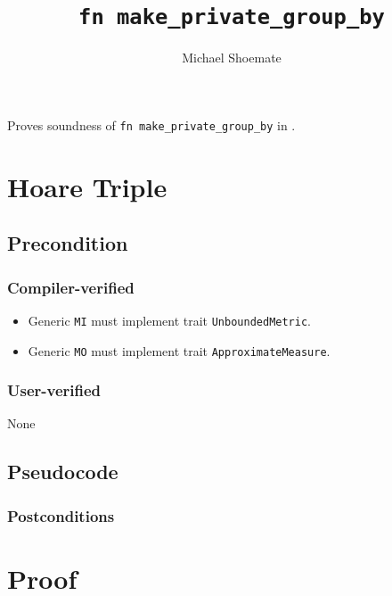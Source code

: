 \documentclass{article}
\title{\texttt{fn make\_private\_group\_by}}
\author{Michael Shoemate}
\date{}
\begin{document}
\maketitle

\contrib
Proves soundness of \texttt{fn make\_private\_group\_by} in .

\section{Hoare Triple}
\subsection*{Precondition}
\subsubsection*{Compiler-verified}
\begin{itemize}
    \item Generic \texttt{MI} must implement trait \texttt{UnboundedMetric}.
    \item Generic \texttt{MO} must implement trait \texttt{ApproximateMeasure}.
\end{itemize}

\subsubsection*{User-verified}
None

\subsection*{Pseudocode}


\subsubsection*{Postconditions}
\begin{theorem}
    \label{postcondition}
\end{theorem}
\section{Proof}
\end{document}
